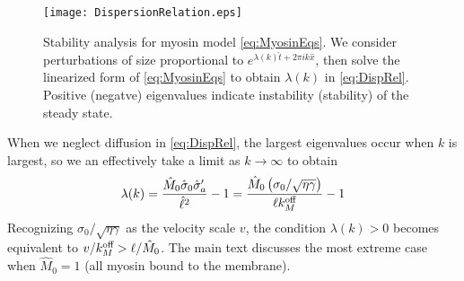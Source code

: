 \documentclass[11pt]{article}
\newcommand{\6}[1]{#1_{\text{6}}}
\newcommand{\3}[1]{#1_{\text{3}}}
\begin{document}
\begin{figure}
\centering
\texttt{[image: DispersionRelation.eps]}
\caption{\label{fig:DispRelMy} Stability analysis for myosin model \eqref{eq:MyosinEqs}. We consider perturbations of size proportional to $e^{\lambda(k) \hat{t}+2 \pi i k \hat{x}}$, then solve the linearized form of \eqref{eq:MyosinEqs} to obtain $\lambda(k)$ in \eqref{eq:DispRel}. Positive (negatve) eigenvalues indicate instability (stability) of the steady state.}
\end{figure}

When we neglect diffusion in \eqref{eq:DispRel}, the largest eigenvalues occur when $k$ is largest, so we an effectively take a limit as $k \rightarrow \infty$ to obtain 
\begin{equation}
\label{eq:DispRel}
\lambda(k) =\frac{\hat M_0 \hat \sigma_0 \hat \sigma_a'}{\hat \ell^2}-1 = \frac{\hat M_0 \left(\sigma_0/\sqrt{\eta \gamma}\right)}{\ell k^\text{off}_M}-1
\end{equation}
Recognizing $\sigma_0/\sqrt{\eta \gamma}$ as the velocity scale $v$, the condition $\lambda(k) > 0$ becomes equivalent to $v/k^\text{off}_M > \ell/\hat M_0$. The main text discusses the most extreme case when $\hat M_0=1$ (all myosin bound to the membrane).
\end{document}
